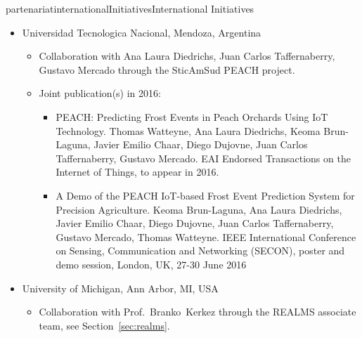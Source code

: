 \documentclass{ra2016}
\begin{document}
\begin{module}{partenariat}{internationalInitiatives}{International Initiatives}
\begin{itemize}
\begin{itemize}
                \begin{itemize}
                    \item Insights into Frequency Diversity from Measurements on an Indoor Low Power Wireless Network Testbed. Pedro Henrique Gomes, Ying Chen, Thomas Watteyne, Bhaskar Krishnamachari.  IEEE Global Telecommunications Conference (GLOBECOM), Workshop on Low-Layer Implementation and Protocol Design for IoT Applications (IoT-LINK), Washington, DC, USA, 4-8 December 2016.
                    \item Reliability through Time-Slotted Channel Hopping and Flooding-based Routing. Pedro Henrique Gomes, Thomas Watteyne, Pradipta Gosh, Bhaskar Krishnamachari. International Conference on Embedded Wireless Systems and Networks (EWSN), Dependability Competition, ACM, Graz, Austria, 14-15 February 2016.
                \end{itemize}
        \end{itemize}
    \item Universidad Tecnologica Nacional, Mendoza, Argentina
        \begin{itemize}
            \item Collaboration with Ana Laura Diedrichs, Juan Carlos Taffernaberry, Gustavo Mercado through the SticAmSud PEACH project.
            \item Joint publication(s) in 2016:
                \begin{itemize}
                    \item PEACH: Predicting Frost Events in Peach Orchards Using IoT Technology. Thomas Watteyne, Ana Laura Diedrichs, Keoma Brun-Laguna, Javier Emilio Chaar, Diego Dujovne, Juan Carlos Taffernaberry, Gustavo Mercado. EAI Endorsed Transactions on the Internet of Things, to appear in 2016.
                    \item A Demo of the PEACH IoT-based Frost Event Prediction System for Precision Agriculture. Keoma Brun-Laguna, Ana Laura Diedrichs,  Javier Emilio Chaar, Diego Dujovne, Juan Carlos Taffernaberry, Gustavo Mercado, Thomas Watteyne. IEEE International Conference on Sensing, Communication and Networking (SECON), poster and demo session, London, UK, 27-30 June 2016
                \end{itemize}
        \end{itemize}
    \item University of Michigan, Ann Arbor, MI, USA
        \begin{itemize}
            \item Collaboration with Prof.~Branko~Kerkez through the REALMS associate team, see Section~\ref{sec:realms}.

\end{itemize}
\end{itemize}
\end{module}
\end{document}
